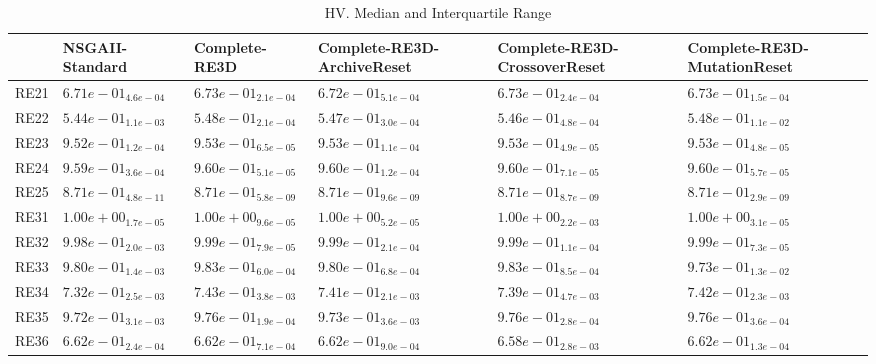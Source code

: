 \documentclass{article}
\begin{document}
\begin{table}
\caption{HV. Median and Interquartile Range}
\label{table: HV}
\centering
\begin{scriptsize}
\begin{tabular}{llllll}
\hline & NSGAII-Standard & Complete-RE3D & Complete-RE3D-ArchiveReset & Complete-RE3D-CrossoverReset &  Complete-RE3D-MutationReset\\
\hline 
RE21 & $  6.71e-01_{ 4.6e-04}$ & $  6.73e-01_{ 2.1e-04}$ & $  6.72e-01_{ 5.1e-04}$ & \cellcolor{gray25}$  6.73e-01_{ 2.4e-04}$ & \cellcolor{gray95}$  6.73e-01_{ 1.5e-04}$ \\
RE22 & $  5.44e-01_{ 1.1e-03}$ & \cellcolor{gray25}$  5.48e-01_{ 2.1e-04}$ & $  5.47e-01_{ 3.0e-04}$ & $  5.46e-01_{ 4.8e-04}$ & \cellcolor{gray95}$  5.48e-01_{ 1.1e-02}$ \\
RE23 & $  9.52e-01_{ 1.2e-04}$ & \cellcolor{gray25}$  9.53e-01_{ 6.5e-05}$ & $  9.53e-01_{ 1.1e-04}$ & \cellcolor{gray95}$  9.53e-01_{ 4.9e-05}$ & $  9.53e-01_{ 4.8e-05}$ \\
RE24 & $  9.59e-01_{ 3.6e-04}$ & \cellcolor{gray95}$  9.60e-01_{ 5.1e-05}$ & $  9.60e-01_{ 1.2e-04}$ & $  9.60e-01_{ 7.1e-05}$ & \cellcolor{gray25}$  9.60e-01_{ 5.7e-05}$ \\
RE25 & \cellcolor{gray95}$  8.71e-01_{ 4.8e-11}$ & $  8.71e-01_{ 5.8e-09}$ & $  8.71e-01_{ 9.6e-09}$ & \cellcolor{gray25}$  8.71e-01_{ 8.7e-09}$ & $  8.71e-01_{ 2.9e-09}$ \\
RE31 & \cellcolor{gray95}$  1.00e+00_{ 1.7e-05}$ & $  1.00e+00_{ 9.6e-05}$ & $  1.00e+00_{ 5.2e-05}$ & $  1.00e+00_{ 2.2e-03}$ & \cellcolor{gray25}$  1.00e+00_{ 3.1e-05}$ \\
RE32 & $  9.98e-01_{ 2.0e-03}$ & \cellcolor{gray25}$  9.99e-01_{ 7.9e-05}$ & $  9.99e-01_{ 2.1e-04}$ & $  9.99e-01_{ 1.1e-04}$ & \cellcolor{gray95}$  9.99e-01_{ 7.3e-05}$ \\
RE33 & $  9.80e-01_{ 1.4e-03}$ & \cellcolor{gray95}$  9.83e-01_{ 6.0e-04}$ & $  9.80e-01_{ 6.8e-04}$ & \cellcolor{gray25}$  9.83e-01_{ 8.5e-04}$ & $  9.73e-01_{ 1.3e-02}$ \\
RE34 & $  7.32e-01_{ 2.5e-03}$ & \cellcolor{gray95}$  7.43e-01_{ 3.8e-03}$ & $  7.41e-01_{ 2.1e-03}$ & $  7.39e-01_{ 4.7e-03}$ & \cellcolor{gray25}$  7.42e-01_{ 2.3e-03}$ \\
RE35 & $  9.72e-01_{ 3.1e-03}$ & \cellcolor{gray95}$  9.76e-01_{ 1.9e-04}$ & $  9.73e-01_{ 3.6e-03}$ & $  9.76e-01_{ 2.8e-04}$ & \cellcolor{gray25}$  9.76e-01_{ 3.6e-04}$ \\
RE36 & \cellcolor{gray25}$  6.62e-01_{ 2.4e-04}$ & $  6.62e-01_{ 7.1e-04}$ & $  6.62e-01_{ 9.0e-04}$ & $  6.58e-01_{ 2.8e-03}$ & \cellcolor{gray95}$  6.62e-01_{ 1.3e-04}$ \\

\end{tabular}
\end{scriptsize}
\end{table}
\end{document}
